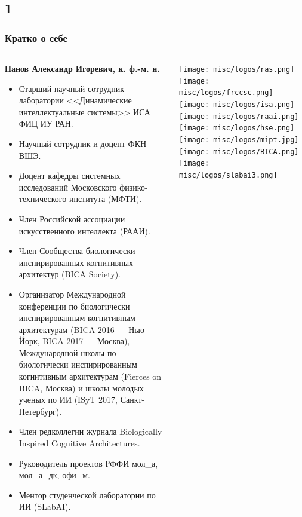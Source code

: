 \documentclass[default]{beamer}
\begin{document}
	\subsection{1}
	\begin{frame}
		\frametitle{Кратко о себе}
		\scriptsize
		\begin{columns}
			\begin{column}{0.85\textwidth}
				\textbf{Панов Александр Игоревич, к. ф.-м. н.}
				\begin{itemize}
					\item Старший научный сотрудник лаборатории <<Динамические интеллектуальные системы>> ИСА ФИЦ ИУ РАН.
					\item Научный сотрудник и доцент ФКН ВШЭ.
					\item Доцент кафедры системных исследований Московского физико-технического института (МФТИ).
					\item Член Российской ассоциации искусственного интеллекта (РААИ).
					\item Член Сообщества биологически инспирированных когнитивных архитектур (BICA Society).
					\item Организатор Международной конференции по биологически инспирированным когнитивным архитектурам (BICA-2016 --- Нью-Йорк, BICA-2017 --- Москва), Международной школы по биологически инспирированным когнитивным архитектурам (Fierces on BICA, Москва) и школы молодых ученых по ИИ (ISyT 2017, Санкт-Петербург).
					\item Член редколлегии журнала Biologically Inspired Cognitive Architectures.					
					\item Руководитель проектов РФФИ мол\_а, мол\_а\_дк, офи\_м.
					\item Ментор студенческой лаборатории по ИИ (SLabAI).
				\end{itemize}
			\end{column}
			
			\begin{column}{0.15\textwidth}
				\centering
				\texttt{[image: misc/logos/ras.png]}
				\vspace{7pt}
				\texttt{[image: misc/logos/frccsc.png]}
				\vspace{7pt}
				\texttt{[image: misc/logos/isa.png]}
				\vspace{7pt}
				\texttt{[image: misc/logos/raai.png]}
				\vspace{7pt}
				\texttt{[image: misc/logos/hse.png]}
				\vspace{7pt}
				\texttt{[image: misc/logos/mipt.jpg]}
				\vspace{5pt}
				\texttt{[image: misc/logos/BICA.png]}
				\vspace{5pt}
				\texttt{[image: misc/logos/slabai3.png]}
			\end{column}
			
		\end{columns}
	\end{frame}
\end{document}
